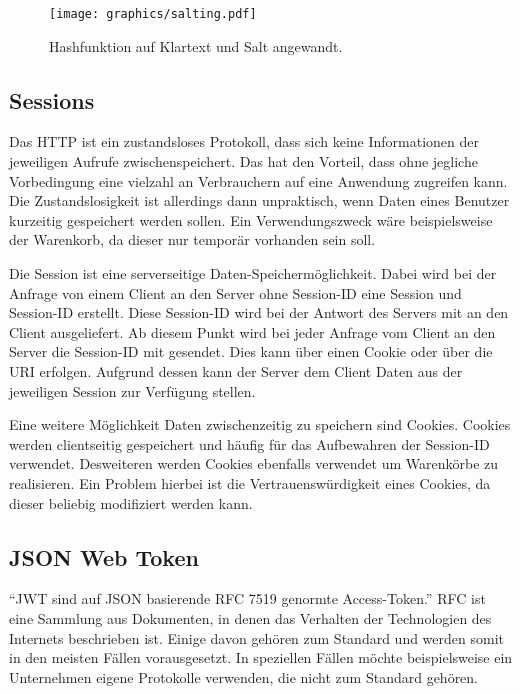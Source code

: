 \begin{figure}
	\centering
	\texttt{[image: graphics/salting.pdf]}
	\caption{Hashfunktion auf Klartext und Salt angewandt.}
	\label{fig:salted-hash}
\end{figure}

\subsection{Sessions}
\label{sec: sessions}
Das \gls{HTTP} ist ein zustandsloses Protokoll, dass sich keine Informationen der jeweiligen Aufrufe zwischenspeichert. Das hat den Vorteil, dass ohne jegliche Vorbedingung eine vielzahl an Verbrauchern auf eine Anwendung zugreifen kann. Die Zustandslosigkeit ist allerdings dann unpraktisch, wenn Daten eines Benutzer kurzeitig gespeichert werden sollen. Ein Verwendungszweck wäre beispielsweise der Warenkorb, da dieser nur temporär vorhanden sein soll.

Die Session ist eine serverseitige Daten-Speichermöglichkeit. Dabei wird bei der Anfrage von einem Client an den Server ohne Session-ID eine Session und Session-ID erstellt. Diese Session-ID wird bei der Antwort des Servers mit an den Client ausgeliefert. Ab diesem Punkt wird bei jeder Anfrage vom Client an den Server die Session-ID mit gesendet. Dies kann über einen Cookie oder über die \gls{URI} erfolgen. Aufgrund dessen kann der Server dem Client Daten aus der jeweiligen Session zur Verfügung stellen.

Eine weitere Möglichkeit Daten zwischenzeitig zu speichern sind Cookies. Cookies werden clientseitig gespeichert und häufig für das Aufbewahren der Session-ID verwendet. Desweiteren werden Cookies ebenfalls verwendet um Warenkörbe zu realisieren. Ein Problem hierbei ist die Vertrauenswürdigkeit eines Cookies, da dieser beliebig modifiziert werden kann.

\subsection{JSON Web Token}
\label{sec: jwt}
\enquote{\gls{JWT} sind auf \gls{JSON} basierende \gls{RFC} 7519 genormte Access-Token.} \gls{RFC} ist eine Sammlung aus Dokumenten, in denen das Verhalten der Technologien des Internets beschrieben ist. Einige davon gehören zum Standard und werden somit in den meisten Fällen vorausgesetzt. In speziellen Fällen möchte beispielsweise ein Unternehmen eigene Protokolle verwenden, die nicht zum Standard gehören.

